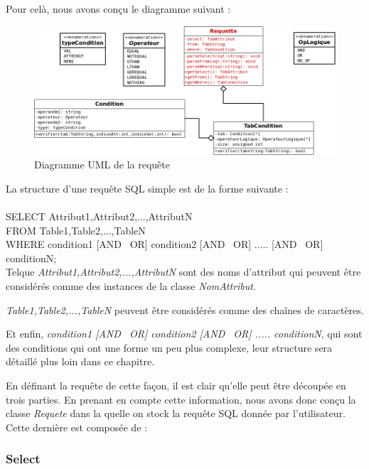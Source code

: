 \documentclass[oneside,13pt,a4paper]{report}
\begin{document}
Pour celà, nous avons conçu le diagramme suivant :

\vfill

\begin{figure}[!h]
	\centering
	\includegraphics[width=1\textwidth]{img/requette.png}
	\vspace{0.1cm}
	\caption{Diagramme UML de la requête}
\end{figure}

\pagebreak

La structure d'une requête SQL simple est de la forme suivante : \\
\\SELECT Attribut1,Attribut2,...,AttributN\\FROM Table1,Table2,...,TableN\\WHERE condition1 [AND \textbar~OR] condition2 [AND \textbar~OR] ..... [AND \textbar~OR] conditionN;\\

Telque \textit{Attribut1,Attribut2,...,AttributN} sont des noms d'attribut qui peuvent être considérés comme des instances de la classe \textit{NomAttribut}.

\textit{Table1,Table2,...,TableN} peuvent être  considérés comme des chaînes de caractères.

Et enfin, \textit{condition1 [AND \textbar~OR] condition2 [AND \textbar~OR] ..... conditionN}, qui sont des conditions qui ont une forme un peu plus complexe, leur structure sera détaillé plus loin dans ce chapitre.

En définant la requête de cette façon, il est clair qu'elle peut être découpée en trois parties. En prenant en compte cette information, nous avons donc conçu la classe 
\textit{Requete} dans la quelle on stock la requête SQL donnée par l'utilisateur. Cette dernière est composée de : 

\subsubsection{Select}
\end{document}
